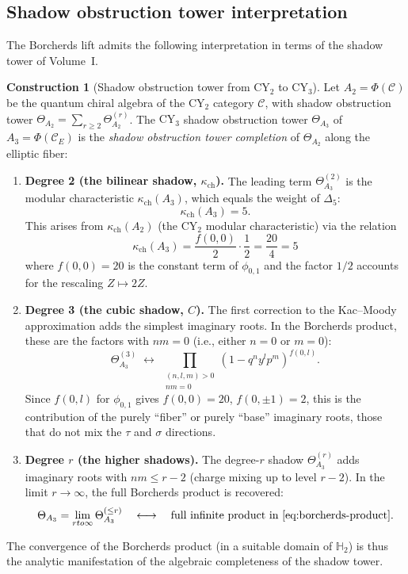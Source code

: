 \documentclass[11pt]{article}
\theoremstyle{plain}
\theoremstyle{definition}
\newtheorem{construction}[theorem]{Construction}
\theoremstyle{remark}
\newcommand{\CY}{\mathrm{CY}}
\newcommand{\cC}{\mathcal{C}}
\begin{document}
\subsection{Shadow obstruction tower interpretation}
\label{subsec:shadow-tower-interp}

The Borcherds lift admits the following interpretation in terms of the shadow
tower of Volume~I.

\begin{construction}[Shadow obstruction tower from $\CY_2$ to $\CY_3$]
\label{constr:shadow-tower-cy2-cy3}
Let $A_2 = \Phi(\cC)$ be the quantum chiral algebra of the $\CY_2$ category
$\cC$, with shadow obstruction tower $\Theta_{A_2} = \sum_{r \geq 2} \Theta^{(r)}_{A_2}$.
The $\CY_3$ shadow obstruction tower $\Theta_{A_3}$ of $A_3 = \Phi(\cC_E)$ is the
\emph{shadow obstruction tower completion} of $\Theta_{A_2}$ along the elliptic fiber:

\begin{enumerate}[label=(\roman*)]
\item \textbf{Degree 2 (the bilinear shadow, $\kappa_{\mathrm{ch}}$).} The leading term
 $\Theta^{(2)}_{A_3}$ is the modular characteristic $\kappa_{\mathrm{ch}}(A_3)$, which equals
 the weight of $\Delta_5$:
 \[
 \kappa_{\mathrm{ch}}(A_3) = 5.
 \]
 This arises from $\kappa_{\mathrm{ch}}(A_2)$ (the $\CY_2$ modular characteristic) via
 the relation
 \[
 \kappa_{\mathrm{ch}}(A_3) = \frac{f(0,0)}{2} \cdot \frac{1}{2} = \frac{20}{4} = 5
 \]
 where $f(0,0) = 20$ is the constant term of $\phi_{0,1}$ and the factor
 $1/2$ accounts for the rescaling $Z \mapsto 2Z$.

\item \textbf{Degree 3 (the cubic shadow, $C$).} The first correction to the
 Kac--Moody approximation adds the simplest imaginary roots. In the Borcherds
 product, these are the factors with $nm = 0$ (i.e., either $n = 0$ or $m = 0$):
 \[
 \Theta^{(3)}_{A_3} \;\longleftrightarrow\; \prod_{\substack{(n,l,m) > 0 \\ nm = 0}}
 (1 - q^n y^l p^m)^{f(0, l)}.
 \]
 Since $f(0, l)$ for $\phi_{0,1}$ gives $f(0, 0) = 20$, $f(0, \pm 1) = 2$,
 this is the contribution of the purely ``fiber'' or purely ``base'' imaginary
 roots, those that do not mix the $\tau$ and $\sigma$ directions.

\item \textbf{Degree $r$ (the higher shadows).} The degree-$r$ shadow
 $\Theta^{(r)}_{A_3}$ adds imaginary roots with $nm \leq r - 2$ (charge mixing
 up to level $r - 2$). In the limit $r \to \infty$, the full Borcherds product
 is recovered:
 \[
 \Theta_{A_3} = \lim_{r \to \infty} \Theta^{(\leq r)}_{A_3}
 \quad \longleftrightarrow \quad
 \text{full infinite product in \eqref{eq:borcherds-product}}.
 \]
\end{enumerate}

The convergence of the Borcherds product (in a suitable domain of $\mathbb{H}_2$)
is thus the analytic manifestation of the algebraic completeness of the shadow
tower.
\end{construction}
\end{document}
